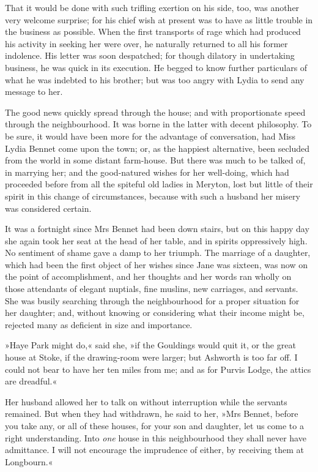 That it would be done with such trifling exertion on his side, too, was another very welcome surprise; for his chief wish at present was to have as little trouble in the business as possible. When the first transports of rage which had produced his activity in seeking her were over, he naturally returned to all his former indolence. His letter was soon despatched; for though dilatory in undertaking business, he was quick in its execution. He begged to know further particulars of what he was indebted to his brother; but was too angry with Lydia to send any message to her.

The good news quickly spread through the house; and with proportionate speed through the neighbourhood. It was borne in the latter with decent philosophy. To be sure, it would have been more for the advantage of conversation, had Miss Lydia Bennet come upon the town; or, as the happiest alternative, been secluded from the world in some distant farm-house. But there was much to be talked of, in marrying her; and the good-natured wishes for her well-doing, which had proceeded before from all the spiteful old ladies in Meryton, lost but little of their spirit in this change of circumstances, because with such a husband her misery was considered certain.

It was a fortnight since Mrs Bennet had been down stairs, but on this happy day she again took her seat at the head of her table, and in spirits oppressively high. No sentiment of shame gave a damp to her triumph. The marriage of a daughter, which had been the first object of her wishes since Jane was sixteen, was now on the point of accomplishment, and her thoughts and her words ran wholly on those attendants of elegant nuptials, fine muslins, new carriages, and servants. She was busily searching through the neighbourhood for a proper situation for her daughter; and, without knowing or considering what their income might be, rejected many as deficient in size and importance.

»Haye Park might do,« said she, »if the Gouldings would quit it, or the great house at Stoke, if the drawing-room were larger; but Ashworth is too far off. I could not bear to have her ten miles from me; and as for Purvis Lodge, the attics are dreadful.«

Her husband allowed her to talk on without interruption while the servants remained. But when they had withdrawn, he said to her, »Mrs Bennet, before you take any, or all of these houses, for your son and daughter, let us come to a right understanding. Into \textit{one} house in this neighbourhood they shall never have admittance. I will not encourage the imprudence of either, by receiving them at Longbourn.«

